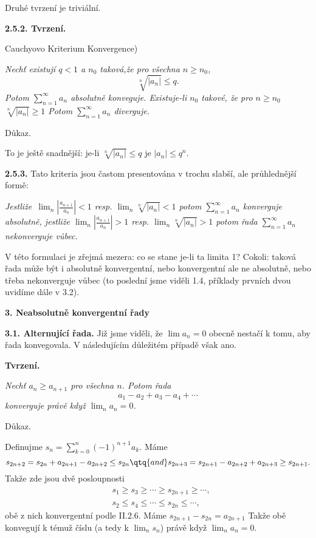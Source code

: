 \documentclass[12pt]{article}
\begin{document}
 Druhé tvrzení je triviální.\sq
 
 \medskip
 
 {\bf 2.5.2. Tvrzení.} {Cauchyovo Kriterium Konvergence) {\em Nechť existují $q<1$ a $n_0$ taková,že pro všechna $n\geq n_0$,
 $$
 \sqrt[n]{|a_n|}\leq q.
 $$
 Potom $\sum_{n=1}^\infty a_n$ absolutně konveguje. Existuje-li $n_0$ takové, že pro $n\geq n_0$
$\sqrt[n]{|a_n|} \geq 1 $
Potom $\sum_{n=1}^\infty a_n$ diverguje.
 
 Důkaz.} To je ještě snadnější: je-li $\sqrt[n]{|a_n|}\leq q$ je
 $|a_n|\leq q^n$.\sq
 
 \medskip
 
 {\bf 2.5.3.} Tato kriteria jsou častom presentována v trochu slabší, ale průhlednější formě:
 
 \smallskip
 
 {\em Jestliže\  $\lim_n \left|\frac{a_{n+1}}{a_n}\right|<1$ resp. $\lim_n\sqrt[n]{|a_n|}<1$
 potom $\sum_{n=1}^\infty a_n$ konverguje absolutně,
      jestliže $\lim_n \left|\frac{a_{n+1}}{a_n}\right|>1$ resp. $\lim_n\sqrt[n]{|a_n|}>1$
 potom řada $\sum_{n=1}^\infty a_n$ nekonverguje vůbec.}
 
 \smallskip
 
 V této formulaci je zřejmá mezera: co se stane je-li ta limita 1? 
 Cokoli: taková řada může být i absolutně konvergentní, nebo konvergentní ale ne absolutně, nebo třeba nekonverguje vůbec (to poslední jsme viděli 1.4, příklady prvních dvou uvidíme dále v 3.2).
 
 \vskip10mm
 
  {\large\bf 3. Neabsolutně konvergentní řady}
 
 \bigskip
 
 {\bf 3.1. Alternující řada.} Již jsme viděli, že $\lim a_n=0$ obecně nestačí k tomu, aby řada konvegovala. V následujícím důležitém případě však ano.
 
 \medskip
 
 {\bf Tvrzení.} {\em Nechť $a_n\geq a_{n+1}$ pro všechna $n$. Potom řada
 $$
 a_1-a_2+a_3- a_4+\cdots
 $$
 konverguje právě když $\lim_na_n=0$.
 
 Důkaz.} Definujme $s_n=\sum_{k=0}^n(-1)^{n+1}a_k$. Máme
 $$
 s_{2n+2}=s_{2n} + a_{2n+1}-a_{2n+2}\leq s_{2n}
 \qtq{and} s_{2n+3}=s_{2n+1} - a_{2n+2}+a_{2n+3}\geq s_{2n+1}.
 $$
 Takže zde jsou dvě posloupnosti
$$
 \begin{aligned}
 &s_1\geq s_3\geq\cdots\geq s_{2n+1}\geq\cdots,\\
 &s_2\leq s_4\leq\cdots\leq s_{2n}\leq\cdots,
 \end{aligned}
 $$
 obě z nich konvergentní podle
 II.2.6. Máme $s_{2n+1}-s_{2n}= a_{2n+1}$ Takže obě konvegují k témuž číslu (a tedy k $\lim_ns_n$) právě když $\lim_na_n=0$.\sq
 
}
\end{document}
